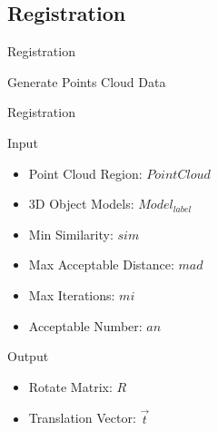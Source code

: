 \documentclass[xcolor=table,compress,blue]{beamer}
\begin{document}
\subsection{Registration}
\begin{frame}{Registration}
	\begin{exampleblock}{Generate Points Cloud Data}
		
	\end{exampleblock}
\end{frame}
\begin{frame}{Registration}
	\begin{exampleblock}{Input}
		\begin{itemize}		
			\item  Point Cloud Region: $Point Cloud$
			\item  3D Object Models: $Model_{label}$
			\item  Min Similarity: $sim$
			\item  Max Acceptable Distance: $mad$
			\item  Max Iterations: $mi$ 
			\item  Acceptable Number: $an$
		\end{itemize}
	\end{exampleblock}
	\begin{exampleblock}{Output}
		\begin{itemize}
			\item Rotate Matrix: $R$
			\item Translation Vector: $\vec t$ 
		\end{itemize}
	\end{exampleblock}
\end{frame}
\end{document}
